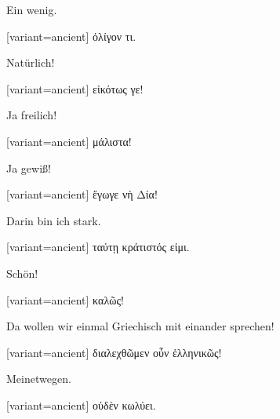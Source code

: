 Ein wenig.

\switchcolumn

\begin{greek}[variant=ancient]%
ὀλίγον τι.

\end{greek}%
\switchcolumn*

Natürlich!

\switchcolumn

\begin{greek}[variant=ancient]%
εἰκότως γε!

\end{greek}%
\switchcolumn*

Ja freilich!

\switchcolumn

\begin{greek}[variant=ancient]%
μάλιστα!

\end{greek}%
\switchcolumn*

Ja gewiß!

\switchcolumn

\begin{greek}[variant=ancient]%
ἔγωγε νὴ Δία!

\end{greek}%
\switchcolumn*

Darin bin ich stark.

\switchcolumn

\begin{greek}[variant=ancient]%
ταύτῃ κράτιστός εἰμι.

\end{greek}%
\switchcolumn*

Schön!

\switchcolumn

\begin{greek}[variant=ancient]%
καλῶς!

\end{greek}%
\switchcolumn*

Da wollen wir einmal Griechisch mit einander sprechen!

\switchcolumn

\begin{greek}[variant=ancient]%
διαλεχθῶμεν οὖν ἑλληνικῶς!

\end{greek}%
\switchcolumn*

Meinetwegen.

\switchcolumn

\begin{greek}[variant=ancient]%
οὐδὲν κωλύει.

\end{greek}%
\switchcolumn*

